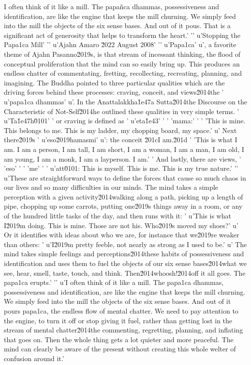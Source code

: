 I often think of it like a mill. The papañca dhammas, possessiveness 
and identification, are like the engine that keeps the mill churning. 
We simply feed into the mill the objects of the six sense bases. And 
out of it pous. That is a significant act of generosity that helps to transform the heart.'
'\n'
u'Stopping the Papa\xf1ca Mill'
'\n'
u'Ajahn Amaro \u2022 August 2008'
'\n'
u'Papa\xf1ca'
u', a favorite theme of Ajahn Pasanno\u2019s, is that stream of incessant thinking, the flood of conceptual proliferation that the mind can so easily bring up. This produces an endless chatter of commentating, fretting, recollecting, recreating, planning, and imagining. The Buddha pointed to three particular qualities which are the driving forces behind these processes: craving, conceit, and views\u2014the '
u'papa\xf1ca dhammas'
u'. In the Anattalakkha\u1e47a Sutta\u2014the Discourse on the Characteristic of Not-Self\u2014he outlined these qualities in very simple terms. '
u'Ta\u1e47h\u0101'
' or craving is defined as '
u'eta\u1e43'
' '
'mama:'
' '
'This is mine. This belongs to me. This is my ladder, my chopping board, my space.'
u' Next there\u2019s '
u'eso\u2019hamasmi'
u': the conceit \u201cI am.\u201d '
'This is what I am. I am a person, I am tall, I am short, I am a woman, I am a man, I am old, I am young, I am a monk, I am a layperson. I am.'
' And lastly, there are views, '
'eso'
' '
'me'
' '
u'att\u0101: This is myself. This is me. This is my true nature.'
'\n'
u'These are straightforward ways to define the forces that cause so much chaos in our lives and so many difficulties in our minds. The mind takes a simple perception with a given activity\u2014walking along a path, picking up a length of pipe, chopping up some carrots, putting one\u2019s things away in a room, or any of the hundred little tasks of the day, and then runs with it: '
u'This is what I\u2019m doing. This is mine. Those are not his. Who\u2019s moved my shoes?'
u' Or it identifies with ideas about who we are, for instance that we\u2019re weaker than others: '
u'I\u2019m pretty feeble, not nearly as strong as I used to be.'
u' The mind takes simple feelings and perceptions\u2014these habits of possessiveness and identification and uses them to fuel the objects of our six sense bases\u2014what we see, hear, smell, taste, touch, and think. Then\u2014whoosh!\u2014off it all goes. The papa\xf1ca erupts.'
'\n'
u'I often think of it like a mill. The papa\xf1ca dhammas, possessiveness and identification, are like the engine that keeps the mill churning. We simply feed into the mill the objects of the six sense bases. And out of it pours papa\xf1ca, the endless flow of mental chatter. We need to pay attention to the engine, to turn it off or stop giving it fuel, rather than getting lost in the stream of mental chatter\u2014the commenting, regretting, planning, and inflating that goes on. Then the whole thing gets a lot quieter and more peaceful. The mind can clearly be aware of the present without creating this whole welter of confusion around it.'
